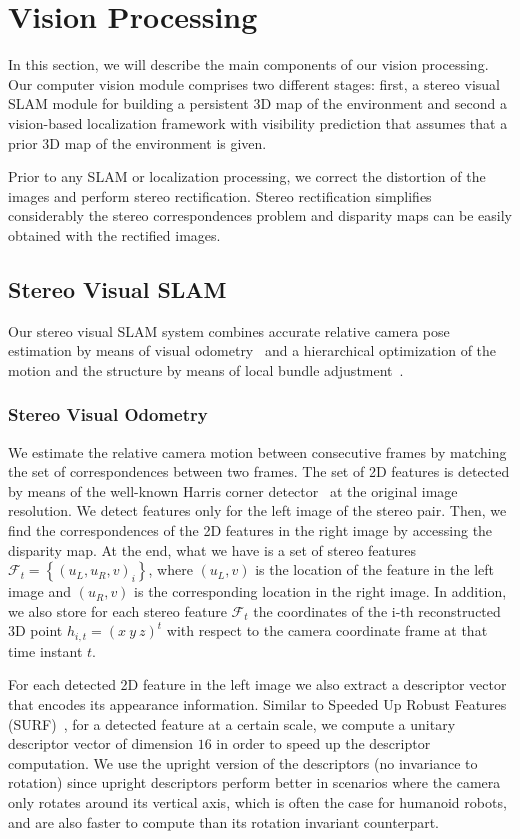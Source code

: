
\section{Vision Processing}\label{sec:vision}
In this section, we will describe the main components of our vision processing. Our computer vision module comprises two different stages: first, a stereo visual SLAM module for building a persistent 3D map of the environment and second a vision-based localization framework with visibility prediction that assumes that a prior 3D map of the environment is given.

Prior to any SLAM or localization processing, we correct the distortion of the images and perform stereo rectification. Stereo rectification simplifies considerably the stereo correspondences problem and disparity maps can be easily obtained with the rectified images.
\subsection{Stereo Visual SLAM}\label{sec:vslam}
Our stereo visual SLAM system combines accurate relative camera pose estimation by means of visual odometry~\cite{Kaess09icra} and a hierarchical optimization of the motion and the structure by means of
local bundle adjustment~\cite{Mouragnon09ivc}.

\subsubsection{Stereo Visual Odometry}\label{sec:visual_odometry}
We estimate the relative camera motion between consecutive frames by matching the set of correspondences between two frames. The set of 2D features is detected by means of the well-known Harris corner detector~\cite{Harris88avc} at the original image resolution. We detect features only for the left image of the stereo pair. Then, we find the correspondences of the 2D features in the right image by
accessing the disparity map. At the end, what we have is a set of stereo features
$\mathcal{F}_{t}=\left\{\left(u_{L},u_{R},v\right)_{i}\right\}$, where $\left(u_{L},v\right)$ is the location of the feature in the left image and $\left(u_{R},v\right)$ is the corresponding location in the
right image. In addition, we also store for each stereo feature $\mathcal{F}_{t}$ the coordinates of the i-th reconstructed 3D point $h_{i,t}=\left(x \ y \ z\right)^{t}$ with respect to the camera
coordinate frame at that time instant $t$.

For each detected 2D feature in the left image we also extract a descriptor vector that encodes its appearance information. Similar to Speeded Up Robust Features (SURF)~\cite{Bay08cviu}, for a detected
feature at a certain scale, we compute a unitary descriptor vector of dimension $16$ in order to speed up the descriptor computation. We use the upright version of the descriptors (no invariance to rotation)
since upright descriptors perform better in scenarios where the camera only rotates around its vertical axis, which is often the case for humanoid robots, and are also faster to compute than its rotation invariant counterpart.

